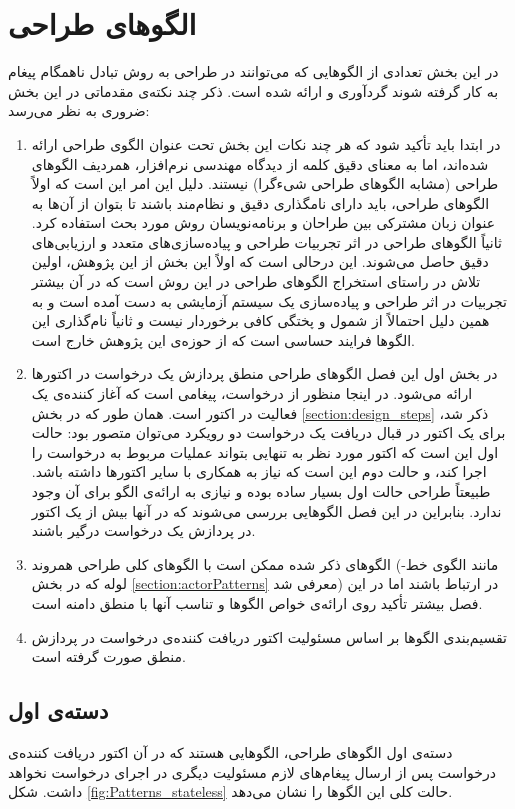 \section{الگوهای طراحی}
در این بخش تعدادی از الگوهایی که می‌توانند در طراحی به روش تبادل ناهمگام پیغام به کار گرفته شوند گردآوری و ارائه شده است. ذکر چند نکته‌ی مقدماتی در این بخش ضروری به نظر می‌رسد:
\begin{enumerate}
\item در ابتدا باید تأکید شود که هر چند نکات این بخش تحت عنوان الگوی طراحی ارائه شده‌اند، اما به معنای دقیق کلمه از دیدگاه مهندسی نرم‌افزار، همردیف الگوهای طراحی (مشابه الگوهای طراحی شیءگرا\cite{GOF})  نیستند. دلیل این امر این است که اولاً الگوهای طراحی، باید دارای نامگذاری دقیق و نظام‌مند باشند تا بتوان از آن‌ها به عنوان زبان مشترکی بین طراحان و برنامه‌نویسان روش مورد بحث استفاده کرد. ثانیاً الگوهای طراحی در اثر تجربیات طراحی و پیاده‌سازی‌های متعدد و  ارزیابی‌های دقیق حاصل می‌شوند. این درحالی‌ است که اولاً این بخش از این پژوهش، اولین تلاش در راستای استخراج الگوهای طراحی در این روش است که در آن بیشتر تجربیات در اثر طراحی و پیاده‌سازی یک سیستم آزمایشی به دست آمده است و به همین دلیل احتمالاً از شمول و پختگی کافی برخوردار نیست و ثانیاً نام‌گذاری این الگوها فرایند حساسی‌ است که از حوزه‌ی این پژوهش خارج است. 
\item در بخش اول این فصل الگوهای طراحی منطق پردازش یک درخواست در اکتورها ارائه می‌شود. در اینجا منظور از درخواست، پیغامی است که آغاز کننده‌ی یک فعالیت در اکتور است.  همان طور که در بخش \ref{section:design_steps} ذکر شد، برای یک اکتور در قبال دریافت یک درخواست دو رویکرد می‌توان متصور بود: حالت اول این است که اکتور مورد نظر به تنهایی بتواند عملیات مربوط به درخواست را اجرا کند، و حالت دوم این است که نیاز به همکاری با سایر اکتورها داشته باشد. طبیعتاً طراحی حالت اول بسیار ساده بوده و نیازی به ارائه‌ی الگو برای آن وجود ندارد. بنابراین در این فصل الگوهایی بررسی می‌شوند که در آنها بیش از یک اکتور در پردازش یک درخواست درگیر باشند.
\item الگوهای ذکر شده ممکن است با الگوهای کلی طراحی همروند (مانند الگوی خط-لوله که در بخش \ref{section:actorPatterns} معرفی شد) در ارتباط باشند اما در این فصل بیشتر تأکید روی ارائه‌ی خواص الگوها و تناسب آنها با منطق دامنه است.
\item تقسیم‌بندی الگوها بر اساس مسئولیت اکتور دریافت کننده‌ی درخواست در پردازش منطق صورت گرفته است. 
\end{enumerate}

\subsection{دسته‌ی اول}
دسته‌ی اول الگوهای طراحی، الگوهایی هستند که در آن اکتور دریافت کننده‌ی درخواست پس از ارسال پیغام‌های لازم مسئولیت دیگری در اجرای درخواست نخواهد داشت. شکل \ref{fig:Patterns_stateless} حالت کلی این الگوها را نشان می‌دهد.

